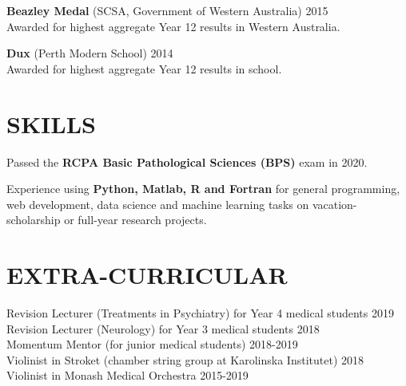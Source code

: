 \documentclass[margin]{res}
\begin{document}
\begin{resume}
{\bf Beazley Medal} (SCSA, Government of Western Australia) \hfill 2015 \\
{\small Awarded for highest aggregate Year 12 results in Western
  Australia.}

{\bf Dux} (Perth Modern School) \hfill 2014\\
{\small Awarded for highest aggregate Year 12 results in school.}

\section{SKILLS}

Passed the {\bf RCPA Basic Pathological Sciences (BPS)} exam in 2020.

Experience using {\bf Python, Matlab, R and Fortran} for general programming, web development, data science and machine learning tasks on vacation-scholarship or full-year research projects. 


\section{EXTRA-CURRICULAR}

Revision Lecturer (Treatments in Psychiatry) for Year 4 medical students \hfill 2019 \\
Revision Lecturer (Neurology) for Year 3 medical students \hfill 2018 \\
Momentum Mentor (for junior medical students) \hfill 2018-2019 \\
Violinist in Stroket (chamber string group at Karolinska Institutet) \hfill 2018 \\
Violinist in Monash Medical Orchestra \hfill 2015-2019 \\

\end{resume}
\end{document}
